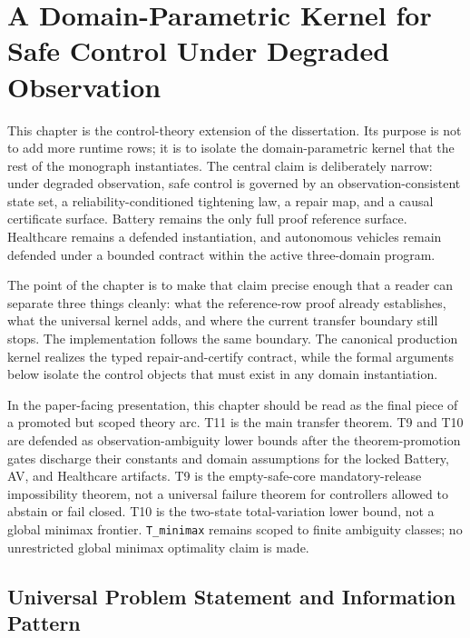 \chapter{A Domain-Parametric Kernel for Safe Control Under Degraded Observation}
\label{ch:universality-completeness}

This chapter is the control-theory extension of the dissertation.  Its
purpose is not to add more runtime rows; it is to isolate the
domain-parametric kernel that the rest of the monograph instantiates.  The
central claim is deliberately narrow: under degraded observation, safe
control is governed by an observation-consistent state set, a
reliability-conditioned tightening law, a repair map, and a causal
certificate surface.  Battery remains the only full proof reference
surface.  Healthcare remains a defended instantiation, and autonomous
vehicles remain defended under a bounded contract within the active
three-domain program.

The point of the chapter is to make that claim precise enough that a reader
can separate three things cleanly: what the reference-row proof already establishes,
what the universal kernel adds, and where the current transfer boundary still
stops.  The implementation follows the same boundary.  The canonical
production kernel realizes the typed repair-and-certify contract, while the
formal arguments below isolate the control objects that must exist in any
domain instantiation.

In the paper-facing presentation, this chapter should be read as the final
piece of a promoted but scoped theory arc.  T11 is the main transfer theorem.
T9 and T10 are defended as observation-ambiguity lower bounds after the
theorem-promotion gates discharge their constants and domain assumptions for
the locked Battery, AV, and Healthcare artifacts.  T9 is the empty-safe-core
mandatory-release impossibility theorem, not a universal failure theorem for
controllers allowed to abstain or fail closed.  T10 is the two-state
total-variation lower bound, not a global minimax frontier.  \texttt{T\_minimax}
remains scoped to finite ambiguity classes; no unrestricted global minimax
optimality claim is made.

\section{Universal Problem Statement and Information Pattern}
\label{sec:universal-kernel-model}

